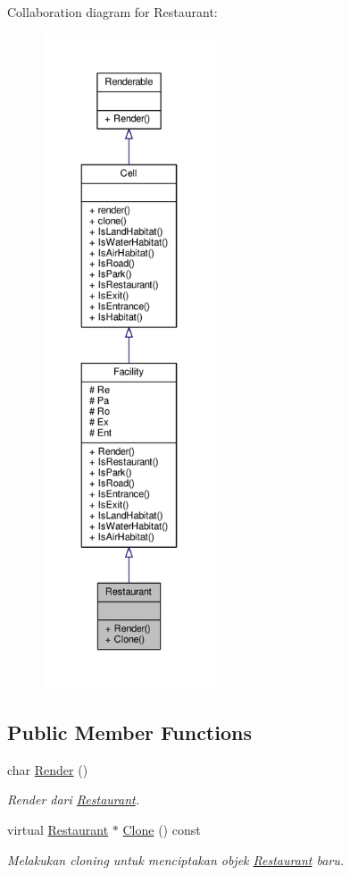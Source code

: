 Collaboration diagram for Restaurant\+:
\nopagebreak
\begin{figure}[H]
\begin{center}
\leavevmode
\includegraphics[height=550pt]{classRestaurant__coll__graph}
\end{center}
\end{figure}
\subsection*{Public Member Functions}
\begin{DoxyCompactItemize}
\item 
char \hyperlink{classRestaurant_a8a44dac5fd1d460aed3a5631e9eb732a}{Render} ()
\begin{DoxyCompactList}\small\item\em Render dari \hyperlink{classRestaurant}{Restaurant}. \end{DoxyCompactList}\item 
virtual \hyperlink{classRestaurant}{Restaurant} $\ast$ \hyperlink{classRestaurant_adb881493e1b2cc348aaefb3c7b2ff7aa}{Clone} () const 
\begin{DoxyCompactList}\small\item\em Melakukan cloning untuk menciptakan objek \hyperlink{classRestaurant}{Restaurant} baru. \end{DoxyCompactList}\end{DoxyCompactItemize}
